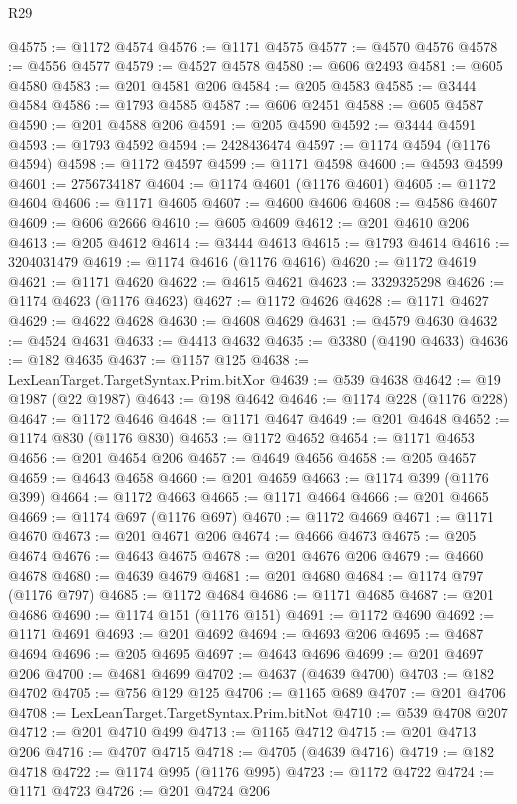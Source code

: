 \begin{lexlean}{R29}
\begin{coremodule}
@4575 := @1172 @4574
@4576 := @1171 @4575
@4577 := @4570 @4576
@4578 := @4556 @4577
@4579 := @4527 @4578
@4580 := @606 @2493
@4581 := @605 @4580
@4583 := @201 @4581 @206
@4584 := @205 @4583
@4585 := @3444 @4584
@4586 := @1793 @4585
@4587 := @606 @2451
@4588 := @605 @4587
@4590 := @201 @4588 @206
@4591 := @205 @4590
@4592 := @3444 @4591
@4593 := @1793 @4592
@4594 := 2428436474
@4597 := @1174 @4594 (@1176 @4594)
@4598 := @1172 @4597
@4599 := @1171 @4598
@4600 := @4593 @4599
@4601 := 2756734187
@4604 := @1174 @4601 (@1176 @4601)
@4605 := @1172 @4604
@4606 := @1171 @4605
@4607 := @4600 @4606
@4608 := @4586 @4607
@4609 := @606 @2666
@4610 := @605 @4609
@4612 := @201 @4610 @206
@4613 := @205 @4612
@4614 := @3444 @4613
@4615 := @1793 @4614
@4616 := 3204031479
@4619 := @1174 @4616 (@1176 @4616)
@4620 := @1172 @4619
@4621 := @1171 @4620
@4622 := @4615 @4621
@4623 := 3329325298
@4626 := @1174 @4623 (@1176 @4623)
@4627 := @1172 @4626
@4628 := @1171 @4627
@4629 := @4622 @4628
@4630 := @4608 @4629
@4631 := @4579 @4630
@4632 := @4524 @4631
@4633 := @4413 @4632
@4635 := @3380 (@4190 @4633)
@4636 := @182 @4635
@4637 := @1157 @125
@4638 := LexLeanTarget.TargetSyntax.Prim.bitXor
@4639 := @539 @4638
@4642 := @19 @1987 (@22 @1987)
@4643 := @198 @4642
@4646 := @1174 @228 (@1176 @228)
@4647 := @1172 @4646
@4648 := @1171 @4647
@4649 := @201 @4648
@4652 := @1174 @830 (@1176 @830)
@4653 := @1172 @4652
@4654 := @1171 @4653
@4656 := @201 @4654 @206
@4657 := @4649 @4656
@4658 := @205 @4657
@4659 := @4643 @4658
@4660 := @201 @4659
@4663 := @1174 @399 (@1176 @399)
@4664 := @1172 @4663
@4665 := @1171 @4664
@4666 := @201 @4665
@4669 := @1174 @697 (@1176 @697)
@4670 := @1172 @4669
@4671 := @1171 @4670
@4673 := @201 @4671 @206
@4674 := @4666 @4673
@4675 := @205 @4674
@4676 := @4643 @4675
@4678 := @201 @4676 @206
@4679 := @4660 @4678
@4680 := @4639 @4679
@4681 := @201 @4680
@4684 := @1174 @797 (@1176 @797)
@4685 := @1172 @4684
@4686 := @1171 @4685
@4687 := @201 @4686
@4690 := @1174 @151 (@1176 @151)
@4691 := @1172 @4690
@4692 := @1171 @4691
@4693 := @201 @4692
@4694 := @4693 @206
@4695 := @4687 @4694
@4696 := @205 @4695
@4697 := @4643 @4696
@4699 := @201 @4697 @206
@4700 := @4681 @4699
@4702 := @4637 (@4639 @4700)
@4703 := @182 @4702
@4705 := @756 @129 @125
@4706 := @1165 @689
@4707 := @201 @4706
@4708 := LexLeanTarget.TargetSyntax.Prim.bitNot
@4710 := @539 @4708 @207
@4712 := @201 @4710 @499
@4713 := @1165 @4712
@4715 := @201 @4713 @206
@4716 := @4707 @4715
@4718 := @4705 (@4639 @4716)
@4719 := @182 @4718
@4722 := @1174 @995 (@1176 @995)
@4723 := @1172 @4722
@4724 := @1171 @4723
@4726 := @201 @4724 @206

\end{coremodule}
\end{lexlean}
